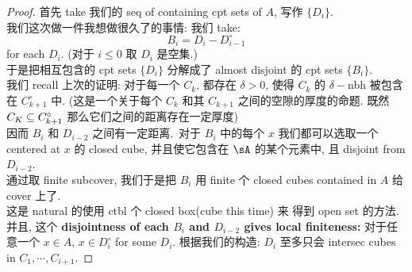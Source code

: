\documentclass[lang=cn,11pt]{elegantbook}
\begin{document}
\begin{proof}
    首先 take 我们的 seq of containing cpt sets of $A$, 写作 $\{D_i\}$.\\
    我们这次做一件我想做很久了的事情: 我们 take:
    $$
    B_i = D_i - D_{i-1}^{\circ}
    $$ for each $D_i$. (对于 $i\leq 0$ 取 $D_i$ 是空集.)\\
    于是把相互包含的 cpt sets $\{D_i\}$ 分解成了 almost disjoint 的 cpt sets $\{B_i\}$. \\
    我们 recall 上次的证明: 对于每一个 $C_k$, 都存在 $\delta > 0$, 使得 $C_k$ 的 $\delta-$nbh 被包含在 $C_{k+1} ^ {\circ}$ 中. (这是一个关于每个 $C_k$ 和其 $C_{k+1}$ 之间的空隙的厚度的命题. 既然 $C_K \subseteq C_{k+1} ^ {\circ}$ 那么它们之间的距离存在一定厚度)\\
    因而 $B_i$ 和 $D_{i-2}$ 之间有一定距离.\
    对于 $B_i$ 中的每个 $x$ 我们都可以选取一个 centered at $x$ 的 closed cube, 并且使它包含在 $\sA$ 的某个元素中, 且 disjoint from $D_{i-2}$.\\
    通过取 finite subcover, 我们于是把 $B_i$ 用 finite 个 closed cubes contained in $A$ 给 cover 上了.\\
    这是 natural 的使用 ctbl 个 closed box(cube this time) 来 得到 open set 的方法.\\
    并且, 这个 \textbf{disjointness of each $B_i$ and $D_{i-2}$ gives local finiteness:} 对于任意一个 $x\in A$, $x \in D_i ^{\circ}$ for some $D_i$. 根据我们的构造: $D_i$ 至多只会 intersec cubes in $C_1, \cdots, C_{i+1}$. 
\end{proof}
\end{document}
